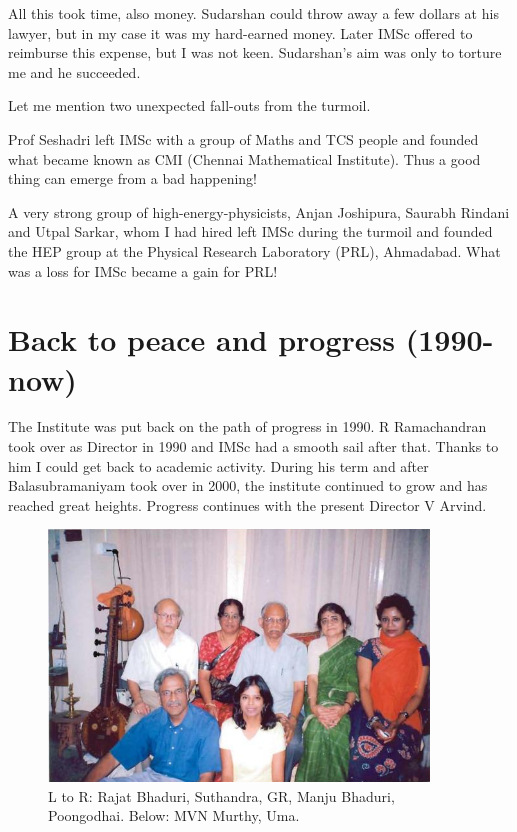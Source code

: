 All this took time, also money. Sudarshan could throw away a few dollars 
at his lawyer, but in my case it was my hard-earned money. Later IMSc 
offered to reimburse this expense, but I was not keen. Sudarshan's aim 
was only to torture me and he succeeded.

Let me mention two unexpected fall-outs from the turmoil.

Prof Seshadri left IMSc with a group of Maths and TCS people and founded 
what became known as CMI (Chennai Mathematical Institute). Thus a good 
thing can emerge from a bad happening!

A very strong group of high-energy-physicists, Anjan Joshipura, Saurabh 
Rindani and Utpal Sarkar, whom I had hired left IMSc during the turmoil 
and founded the HEP group at the Physical Research Laboratory 
(PRL), Ahmadabad. What was a loss for IMSc became a gain for PRL!

\section*{Back to peace and progress (1990-now)}

The Institute was put back on the path of progress in 1990. R 
Ramachandran took over as Director in 1990 and IMSc had a smooth sail 
after that. Thanks to him I could get back to academic activity. During 
his term and after Balasubramaniyam took over in 2000, the institute 
continued to grow and has reached great heights. Progress continues with 
the present Director V Arvind.
\medskip
\begin{figure}[h]
\centering
\includegraphics[width=0.9\textwidth]{images/Rajaji-family.jpg}
\caption{ L to R: Rajat Bhaduri, Suthandra, GR, Manju Bhaduri, Poongodhai.
Below: MVN Murthy, Uma.}
\end{figure}

